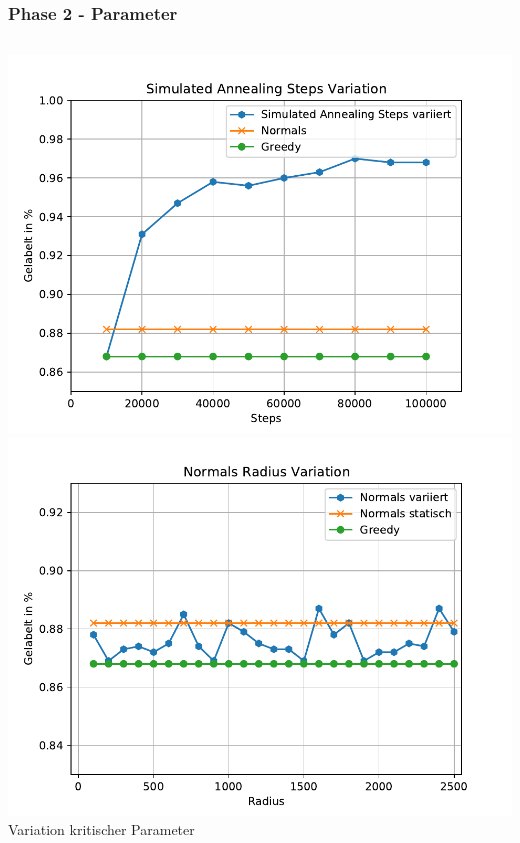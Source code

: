 \documentclass[aspectratio=169]{beamer}
\begin{document}
\begin{frame}
	\frametitle{Phase 2 - Parameter}
	
	\begin{columns}[c] %
		
		\includegraphics[scale=.41]{sa_variant.pdf}
		\includegraphics[scale=.41]{normals_variant.pdf}\\
		\centering Variation kritischer Parameter
		
	
	\end{columns}
	\end{frame}
	
\end{document}
